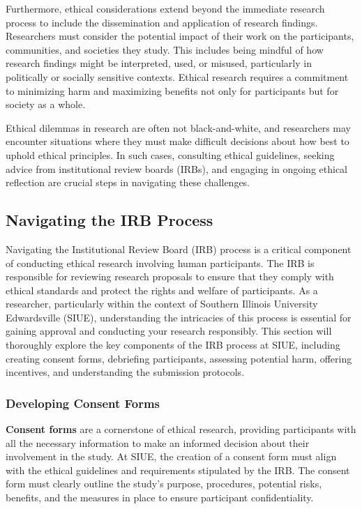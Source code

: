 \documentclass[
]{book}
\begin{document}
Furthermore, ethical considerations extend beyond the immediate research process to include the dissemination and application of research findings. Researchers must consider the potential impact of their work on the participants, communities, and societies they study. This includes being mindful of how research findings might be interpreted, used, or misused, particularly in politically or socially sensitive contexts. Ethical research requires a commitment to minimizing harm and maximizing benefits not only for participants but for society as a whole.

Ethical dilemmas in research are often not black-and-white, and researchers may encounter situations where they must make difficult decisions about how best to uphold ethical principles. In such cases, consulting ethical guidelines, seeking advice from institutional review boards (IRBs), and engaging in ongoing ethical reflection are crucial steps in navigating these challenges.

\subsection*{Navigating the IRB Process}\label{navigating-the-irb-process}

Navigating the Institutional Review Board (IRB) process is a critical component of conducting ethical research involving human participants. The IRB is responsible for reviewing research proposals to ensure that they comply with ethical standards and protect the rights and welfare of participants. As a researcher, particularly within the context of Southern Illinois University Edwardsville (SIUE), understanding the intricacies of this process is essential for gaining approval and conducting your research responsibly. This section will thoroughly explore the key components of the IRB process at SIUE, including creating consent forms, debriefing participants, assessing potential harm, offering incentives, and understanding the submission protocols.

\subsubsection*{Developing Consent Forms}\label{developing-consent-forms}

\textbf{Consent forms} are a cornerstone of ethical research, providing participants with all the necessary information to make an informed decision about their involvement in the study. At SIUE, the creation of a consent form must align with the ethical guidelines and requirements stipulated by the IRB. The consent form must clearly outline the study's purpose, procedures, potential risks, benefits, and the measures in place to ensure participant confidentiality.
\end{document}
